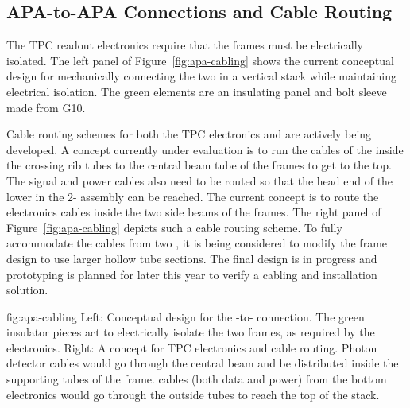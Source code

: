 \subsection{APA-to-APA Connections and Cable Routing}
\label{sec:fdsp-apa-intfc-apa}

The TPC readout electronics require that the  frames must be electrically isolated.  The left panel of Figure~\ref{fig:apa-cabling} shows the current conceptual design for mechanically connecting the two  in a vertical stack while maintaining electrical isolation.  The green elements are an insulating panel and bolt sleeve made from G10. 

Cable routing schemes for both the TPC electronics and  are actively being developed.  A concept currently under evaluation is to run the cables of the  inside the crossing rib tubes to the central beam tube of the  frames to get to the top.  The  signal and power cables also need to be routed so that the head end of the lower  in the 2- assembly can be reached. The current concept is to route the electronics cables inside the two side beams of the  frames. The right panel of Figure~\ref{fig:apa-cabling} depicts such a cable routing scheme. To fully accommodate the cables from two , it is being considered to modify the  frame design to use larger hollow tube sections. The final design is in progress and prototyping is planned for later this year to verify a cabling and installation solution.     

\begin{dunefigure}{fig:apa-cabling}
{Left: Conceptual design for the -to- connection.  The green insulator pieces act to electrically isolate the two frames, as required by the  electronics.  Right: A concept for TPC electronics and  cable routing. Photon detector cables would go through the central beam and be distributed inside the supporting tubes of the  frame.   cables (both data and power) from the bottom  electronics would go through the outside tubes to reach the top of the stack.}
\setlength{\fboxsep}{0pt}
\setlength{\fboxrule}{0.5pt}
\end{dunefigure}
